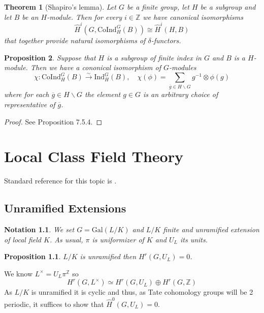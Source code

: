 \documentclass[twoside, 12pt]{iiser-thesis}
\newtheorem{thm}{Theorem}[section]
\newtheorem{prop}[thm]{ Proposition}
\newtheorem{notation}{ Notation}[section]
\newcommand{\Z}{\mathbb{Z}}
\begin{document}
\begin{thm}[Shapiro's lemma]\label{shapiro}
Let $G$ be a finite group, let $H$ be a subgroup and let $B$ be an $H$-module. Then for every $i\in \Z$ we have canonical isomorphisms \[ \hat H^i (G, \text{CoInd}^G_H(B)) \cong \hat H^i(H,B)\] that together provide natural isomorphisms of $\delta$-functors.
\end{thm}
\begin{prop}
Suppose that $H$ is a subgroup of finite index in $G$ and $B$ is a $H$-module. Then we have a cononical isomorphism of $G$-modules \[\chi: \text{CoInd}^G_H(B) \xrightarrow{\sim}\text{Ind}^G_H(B), \quad \chi (\phi) = \sum _{\overline g \in H \backslash G } g^{-1}\otimes \phi (g)\]
where for each $\overline g \in H \backslash G$ the element $g\in G$ is an arbitrary choice of representative of $\overline g$.
\end{prop}
\begin{proof}
See \cite{sharifi} Proposition 7.5.4.
\end{proof}

















\chapter{Local Class Field Theory}
Standard reference for this topic is \cite{milneCFT}.
\section{Unramified Extensions}\label{sec1}
\begin{notation} 
We set $G= \text{Gal} (L/K)$ and $L/K$ finite and unramified extension of local field $K$. As usual, $\pi$ is uniformizer of $K$ and $U_L$ its units.
    
\end{notation} 
\begin{prop}
$L/K$ is unramified then $H^r(G,U_L)=0$.
\end{prop}
We know $ L^\times =U_L \pi ^ \mathbb  Z$ so $$H^r(G, L^\times ) \simeq H^r(G, U_L) \oplus H^r(G, \Z)$$
As $L/K$ is unramified it is cyclic and thus, as Tate cohomology groups will be 2 periodic, it suffices to show that $\hat H ^0 (G, U_L) =0$.
\end{document}
